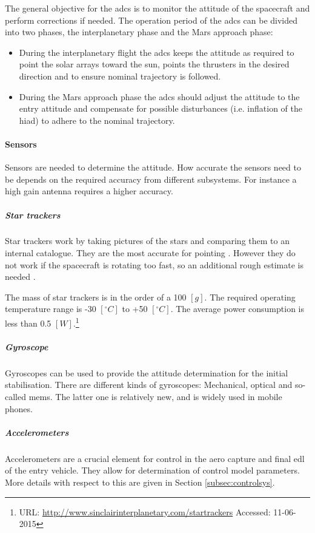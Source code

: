 The general objective for the \gls{adcs} is to monitor the attitude of the spacecraft and perform corrections if needed. The operation period of the \gls{adcs} can be divided into two phases, the interplanetary phase and the Mars approach phase:
\begin{itemize}
\item During the interplanetary flight the \gls{adcs} keeps the attitude as required to point the solar arrays toward the sun, points the thrusters in the desired direction and to ensure nominal trajectory is followed.

\item During the Mars approach phase the \gls{adcs} should adjust the attitude to the entry attitude and compensate for possible disturbances (i.e. inflation of the \gls{hiad}) to adhere to the nominal trajectory.
\end{itemize}
\paragraph{Sensors} Sensors are needed to determine the attitude. How accurate the sensors need to be depends on the required accuracy from different subsystems. For instance a high gain antenna requires a higher accuracy. 

\subparagraph{Star trackers}
Star trackers work by taking pictures of the stars and comparing them to an internal catalogue. They are the most accurate for pointing \cite{CarlChristianLiebe1995}. However they do not work if the spacecraft is rotating too fast, so an additional rough estimate is needed \cite[p. 584]{Wertz2011}. 

The mass of star trackers is in the order of a 100 $\left[g\right]$. The required operating temperature range is -30 $\left[^\circ C\right]$ to +50 $\left[^\circ C\right]$. The average power consumption is less than 0.5 $\left[W\right]$.\footnote{URL: \url{http://www.sinclairinterplanetary.com/startrackers} Accessed: 11-06-2015}

\subparagraph{Gyroscope}                        
Gyroscopes can be used to provide the attitude determination for the initial stabilisation. There are different kinds of gyroscopes: Mechanical, optical and so-called \gls{mems}. The latter one is relatively new, and is widely used in mobile phones. 

\subparagraph{Accelerometers}                        
Accelerometers are a crucial element for control in the aero capture and final \gls{edl} of the entry vehicle. They allow for determination of control model parameters. More details with respect to this are given in Section \ref{subsec:controlsys}.


